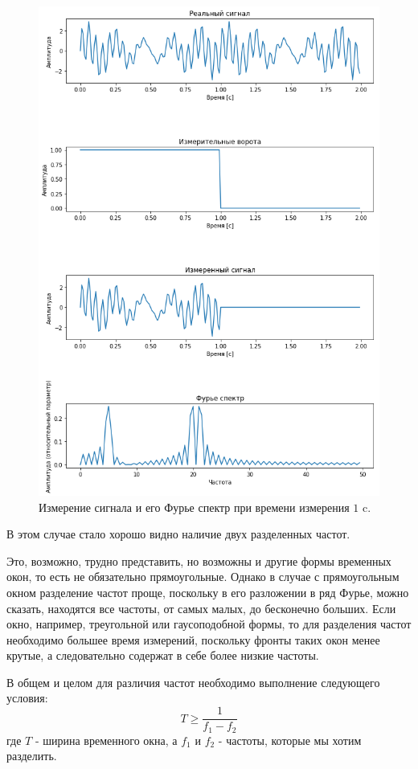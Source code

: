 \begin{figure}[!h]
    \centering
    \includegraphics[scale = 0.5]{Pictures/separation_rectangular.png}
    \caption{Измерение сигнала и его Фурье спектр при времени измерения $1$ c.}
    \label{fig:rect_1}
\end{figure}

В этом случае стало хорошо видно наличие двух разделенных частот. 

Это, возможно, трудно представить, но возможны и другие формы временных окон, то есть не обязательно прямоугольные. Однако в случае с прямоугольным окном разделение частот проще, поскольку в его разложении в ряд Фурье, можно сказать, находятся все частоты, от самых малых, до бесконечно больших. Если окно, например, треугольной или гаусоподобной формы, то для разделения частот необходимо большее время измерений, поскольку фронты таких окон менее крутые, а следовательно содержат в себе более низкие частоты.

В общем и целом для различия частот необходимо выполнение следующего условия:
\begin{equation}
    T\geqslant \frac{1}{f_1 - f_2}
\end{equation}
где $T$ - ширина временного окна, а $f_1$ и $f_2$ - частоты, которые мы хотим разделить.
